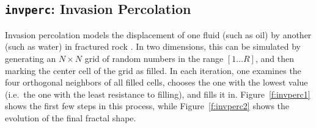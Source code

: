 \subsection{{\tt{invperc}}:
	Invasion Percolation
	\label{s:toys-invperc}}

Invasion percolation models the displacement of one fluid
(such as oil)
by another
(such as water)
in fractured rock \cite{b:percolation-theory}.
In two dimensions,
this can be simulated by generating
an $N{\times}N$ grid of random numbers in the range $[1{\ldots}R]$,
and then marking the center cell of the grid as filled.
In each iteration,
one examines the four orthogonal neighbors of all filled cells,
chooses the one with the lowest value
(i.e.\ the one with the least resistance to filling),
and fills it in.
Figure~\ref{f:invperc1} shows the first few steps in this process,
while Figure~\ref{f:invperc2} shows the evolution of the final fractal shape.

